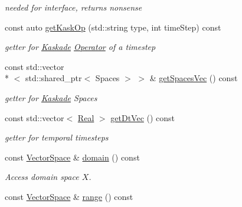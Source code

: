\begin{DoxyCompactItemize}
\begin{DoxyCompactList}\small\item\em needed for interface, returns nonsense \end{DoxyCompactList}\item 
const auto \hyperlink{classSpacy_1_1KaskadeParabolic_1_1PDE_1_1NormOperator_a13172606af76f223ced5e6361ef88126}{get\-Kask\-Op} (std\-::string type, int time\-Step) const 
\begin{DoxyCompactList}\small\item\em getter for \hyperlink{namespaceSpacy_1_1Kaskade}{Kaskade} \hyperlink{classSpacy_1_1Operator}{Operator} of a timestep \end{DoxyCompactList}\item 
const std\-::vector\\*
$<$ std\-::shared\-\_\-ptr$<$ Spaces $>$ $>$ \& \hyperlink{classSpacy_1_1KaskadeParabolic_1_1PDE_1_1NormOperator_ab9e141cf857b274cc387a0aaed7cae1c}{get\-Spaces\-Vec} () const 
\begin{DoxyCompactList}\small\item\em getter for \hyperlink{namespaceSpacy_1_1Kaskade}{Kaskade} Spaces \end{DoxyCompactList}\item 
const std\-::vector$<$ \hyperlink{classSpacy_1_1Real}{Real} $>$ \hyperlink{classSpacy_1_1KaskadeParabolic_1_1PDE_1_1NormOperator_aba6623fbd1beba85e76d475f762e5f08}{get\-Dt\-Vec} () const 
\begin{DoxyCompactList}\small\item\em getter for temporal timesteps \end{DoxyCompactList}\item 
\hypertarget{classSpacy_1_1OperatorBase_a2588f9b3e0188820c4c494e63293dc6f}{const \hyperlink{classSpacy_1_1VectorSpace}{Vector\-Space} \& \hyperlink{classSpacy_1_1OperatorBase_a2588f9b3e0188820c4c494e63293dc6f}{domain} () const }\label{classSpacy_1_1OperatorBase_a2588f9b3e0188820c4c494e63293dc6f}

\begin{DoxyCompactList}\small\item\em Access domain space $X$. \end{DoxyCompactList}\item 
\hypertarget{classSpacy_1_1OperatorBase_ab19d3b7a6f290b1079248f1e567e53d6}{const \hyperlink{classSpacy_1_1VectorSpace}{Vector\-Space} \& \hyperlink{classSpacy_1_1OperatorBase_ab19d3b7a6f290b1079248f1e567e53d6}{range} () const }\label{classSpacy_1_1OperatorBase_ab19d3b7a6f290b1079248f1e567e53d6}


\end{DoxyCompactItemize}
